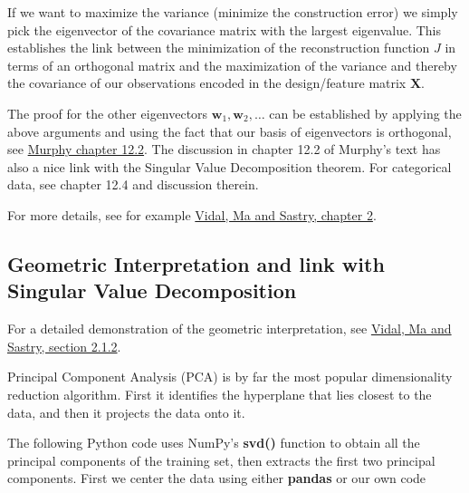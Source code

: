 \documentclass[%
oneside,                 %
final,                   %
10pt]{article}
\begin{document}
If we want to maximize the variance (minimize the construction error)
we simply pick the eigenvector of the covariance matrix with the
largest eigenvalue. This establishes the link between the minimization
of the reconstruction function $J$ in terms of an orthogonal matrix
and the maximization of the variance and thereby the covariance of our
observations encoded in the design/feature matrix $\bm{X}$.

The proof
for the other eigenvectors $\bm{w}_1,\bm{w}_2,\dots$ can be
established by applying the above arguments and using the fact that
our basis of eigenvectors is orthogonal, see \href{{https://mitpress.mit.edu/books/machine-learning-1}}{Murphy chapter
12.2}.  The
discussion in chapter 12.2 of Murphy's text has also a nice link with
the Singular Value Decomposition theorem. For categorical data, see
chapter 12.4 and discussion therein.

For more details, see for example \href{{https://www.springer.com/gp/book/9780387878102}}{Vidal, Ma and Sastry, chapter 2}.

\subsection{Geometric Interpretation and link with Singular Value Decomposition}

For a detailed demonstration of the geometric interpretation, see \href{{https://www.springer.com/gp/book/9780387878102}}{Vidal, Ma and Sastry, section 2.1.2}.

Principal Component Analysis (PCA) is by far the most popular dimensionality reduction algorithm.
First it identifies the hyperplane that lies closest to the data, and then it projects the data onto it.

The following Python code uses NumPy’s \textbf{svd()} function to obtain all the principal components of the
training set, then extracts the first two principal components. First we center the data using either \textbf{pandas} or our own code
\end{document}
